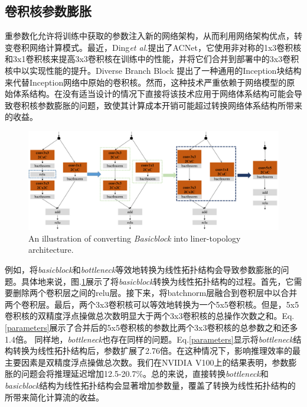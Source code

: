 \subsection{卷积核参数膨胀}
\label{para_expan}
重参数化\cite{2019ACNet,2021Diverse}允许将训练中获取的参数注入新的网络架构，从而利用网络架构优点，转变卷积网络计算模式。最近，Ding\textit{et al.}提出了ACNet\cite{2019ACNet}，它使用非对称的1x3卷积核和3x1卷积核来提高3x3卷积核在训练中的性能，并将它们合并到部署中的3x3卷积核中以实现性能的提升。Diverse Branch Block \cite{2021Diverse}提出了一种通用的Inception块结构来代替Inception网络中原始的卷积核。然而，这种技术严重依赖于网络模型的原始体系结构。在没有适当设计的情况下直接将该技术应用于网络体系结构可能会导致卷积核参数膨胀的问题，致使其计算成本开销可能超过转换网络体系结构所带来的收益。

\begin{figure}[ht]
	\centering
	\includegraphics[width=1\textwidth]{figures/Jresnet/FIG3_TII-21-2603.pdf}
	\caption{An illustration of converting \emph{Basicblock} into liner-topology architecture.}
	\label{basic_block_merge}
\end{figure}
例如，将\emph{basicblock}和\emph{bottleneck}等效地转换为线性拓扑结构会导致参数膨胀的问题。具体地来说，图.\ref{basic_block_merge}展示了将\emph{basicblock}转换为线性拓扑结构的过程。首先，它需要删除两个卷积层之间的relu层。接下来，将batchnorm层融合到卷积层中以合并两个卷积层。最后，两个3x3卷积核可以等效地转换为一个5x5卷积核\cite{2016Rethinking}。但是，5x5卷积核的双精度浮点操做总次数明显大于两个3x3卷积核的总操作次数之和。Eq.\ref{parameters}展示了合并后的5x5卷积核的参数比两个3x3卷积核的总参数之和还多1.4倍。 同样地，\emph{bottleneck}也存在同样的问题。Eq.\ref{parameters}显示将\emph{bottleneck}结构转换为线性拓扑结构后，参数扩展了2.76倍。在这种情况下，影响推理效率的最主要因素是双精度浮点操做总次数。我们在NVIDIA V100上的结果表明，参数膨胀的问题会将推理延迟增加12.5-20.7\%。总的来说，直接转换\emph{bottleneck}和\emph{basicblock}结构为线性拓扑结构会显著增加参数量，覆盖了转换为线性拓扑结构的所带来简化计算流的收益。

